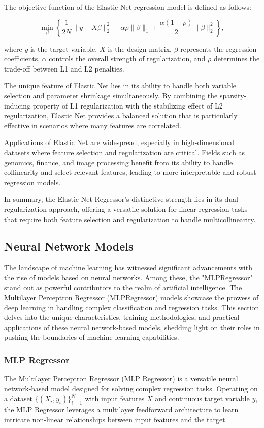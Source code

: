 \documentclass[twocolumn]{article}
\begin{document}
The objective function of the Elastic Net regression model is defined as follows:

\[ \min_{\beta} \left\{ \frac{1}{2N} \|y - X\beta\|_2^2 + \alpha \rho \| \beta \|_1 + \frac{\alpha(1-\rho)}{2} \| \beta \|_2^2 \right\}, \]

where \(y\) is the target variable, \(X\) is the design matrix, \(\beta\) represents the regression coefficients, \(\alpha\) controls the overall strength of regularization, and \(\rho\) determines the trade-off between L1 and L2 penalties.

The unique feature of Elastic Net lies in its ability to handle both variable selection and parameter shrinkage simultaneously. By combining the sparsity-inducing property of L1 regularization with the stabilizing effect of L2 regularization, Elastic Net provides a balanced solution that is particularly effective in scenarios where many features are correlated.

Applications of Elastic Net are widespread, especially in high-dimensional datasets where feature selection and regularization are critical. Fields such as genomics, finance, and image processing benefit from its ability to handle collinearity and select relevant features, leading to more interpretable and robust regression models.

In summary, the Elastic Net Regressor's distinctive strength lies in its dual regularization approach, offering a versatile solution for linear regression tasks that require both feature selection and regularization to handle multicollinearity.

	\subsection{Neural Network Models}
The landscape of machine learning has witnessed significant advancements with the rise of models based on neural networks. Among these, the "MLPRegressor" stand out as powerful contributors to the realm of artificial intelligence. The Multilayer Perceptron Regressor (MLPRegressor) models showcase the prowess of deep learning in handling complex classification and regression tasks. This section delves into the unique characteristics, training methodologies, and practical applications of these neural network-based models, shedding light on their roles in pushing the boundaries of machine learning capabilities.
		\subsubsection{MLP Regressor}
The Multilayer Perceptron Regressor (MLP Regressor) is a versatile neural network-based model designed for solving complex regression tasks. Operating on a dataset \(\{(X_i, y_i)\}_{i=1}^{N}\) with input features \(X\) and continuous target variable \(y\), the MLP Regressor leverages a multilayer feedforward architecture to learn intricate non-linear relationships between input features and the target.
\end{document}
